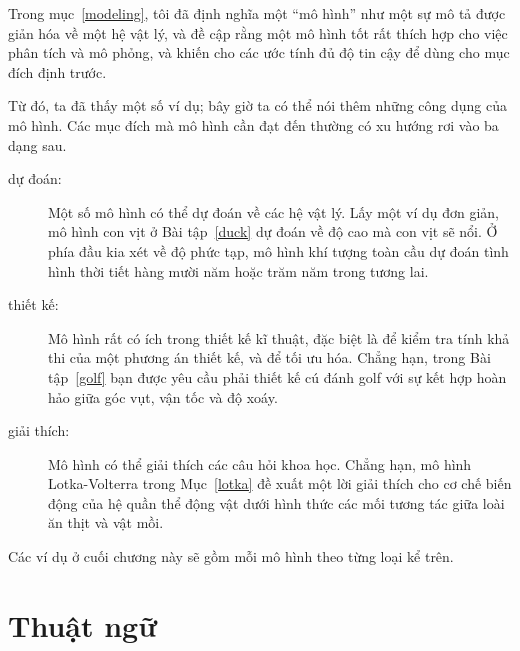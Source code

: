 \documentclass[12pt]{book}
\begin{document}
Trong mục~\ref{modeling}, tôi đã định nghĩa một ``mô hình'' như một
sự mô tả được giản hóa về một hệ vật lý, và đề cập rằng một mô hình
tốt rất thích hợp cho việc phân tích và mô phỏng, và khiến cho các 
ước tính đủ độ tin cậy để dùng cho mục đích định trước.

Từ đó, ta đã thấy một số ví dụ; bây giờ ta có thể nói thêm những công
dụng của mô hình. Các mục đích mà mô hình cần đạt đến thường có
xu hướng rơi vào ba dạng sau.
 
\begin{description}

\item[dự đoán:] Một số mô hình có thể dự đoán về các hệ vật lý. Lấy
một ví dụ đơn giản, mô hình con vịt ở Bài tập~\ref{duck} dự đoán về
độ cao mà con vịt sẽ nổi. Ở phía đầu kia xét về độ phức tạp, mô hình
khí tượng toàn cầu dự đoán tình hình thời tiết hàng mười năm hoặc
trăm năm trong tương lai.

\item[thiết kế:] Mô hình rất có ích trong thiết kế kĩ thuật, đặc biệt
là để kiểm tra tính khả thi của một phương án thiết kế, và để 
tối ưu hóa. Chẳng hạn, trong Bài tập~\ref{golf} bạn được yêu cầu
phải thiết kế cú đánh golf với sự kết hợp hoàn hảo giữa góc vụt,
vận tốc và độ xoáy.

\item[giải thích:] Mô hình có thể giải thích các câu hỏi khoa học.
Chẳng hạn, mô hình Lotka-Volterra trong Mục~\ref{lotka} đề xuất
một lời giải thích cho cơ chế biến động của hệ quần thể động vật
dưới hình thức các mối tương tác giữa loài ăn thịt và vật mồi.

\end{description}

Các ví dụ ở cuối chương này sẽ gồm mỗi mô hình theo từng loại
kể trên.


\section{Thuật ngữ}
\end{document}
